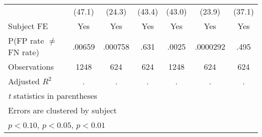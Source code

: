 \begin{table}[htbp]
\begin{tabular}{l*{6}{c}}
                &   (47.1)         &   (24.3)         &   (43.4)         &   (43.0)         &   (23.9)         &   (37.1)         \\
Subject FE      &      Yes         &      Yes         &      Yes         &      Yes         &      Yes         &      Yes         \\
\hline
P(FP rate $\neq$ FN rate)&   .00659         &  .000758         &     .631         &    .0025         & .0000292         &     .495         \\
Observations    &     1248         &      624         &      624         &     1248         &      624         &      624         \\
Adjusted \(R^{2}\)&        .         &        .         &        .         &        .         &        .         &        .         \\
\hline\hline
\multicolumn{7}{l}{\footnotesize \textit{t} statistics in parentheses}\\
\multicolumn{7}{l}{\footnotesize Errors are clustered by subject}\\
\multicolumn{7}{l}{\footnotesize \sym{*} \(p<0.10\), \sym{**} \(p<0.05\), \sym{***} \(p<0.01\)}\\
\end{tabular}
\end{table}
